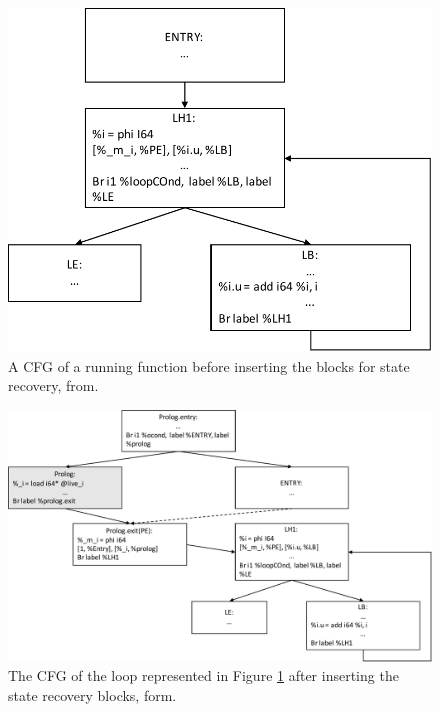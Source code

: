 \begin{figure}[h]
\centering
\includegraphics[scale=0.5]{Figures/FCFG}
\decoRule
\caption[A CFG of a running function before inserting the blocks for state recovery]{A CFG of a running function before inserting the blocks for state recovery, from\cite{lameed2013modular}.}
\label{FCFG}
\end{figure}

\begin{figure}[h]
\centering
\includegraphics[scale=0.5]{Figures/FOptCFG}
\decoRule
\caption[The CFG of the loop represented in Figure \ref{FCFG} after inserting the state recovery blocks, form\cite{lameed2013modular}.]{The CFG of the loop represented in Figure \ref{FCFG} after inserting the state recovery blocks, form\cite{lameed2013modular}.}
\label{InstFCFG}
\end{figure}\\


